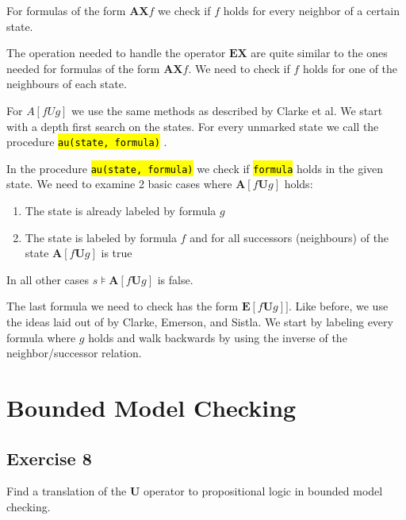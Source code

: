 \documentclass[a4paper, 12pt]{article}
\newcommand{\codeinput}[1]
{
    \begin{leftbar}
        {\fontsize{9pt}{11pt}}
    \end{leftbar}
}
\newcommand{\code}[1]
{
    \hl{\texttt{#1}}
}
\begin{document}
For formulas of the form $\mathbf{AX} f$ we check if $f$ holds for every
neighbor of a certain state.

\codeinput{label_AX}

The operation needed to handle the operator $\mathbf{EX}$ are quite similar to
the ones needed for formulas of the form $\mathbf{AX} f$. We need to check if
$f$ holds for one of the neighbours of each state.

\codeinput{label_EX}

For $A[f U g]$ we use the same methods as described by Clarke et al. We start
with a depth first search on the states. For every unmarked state we call the
procedure \code{au(state, formula)}.

\codeinput{label_AU}

In the procedure \code{au(state, formula)} we check if \code{formula} holds in
the given state. We need to examine 2 basic cases where $\textbf{A}[f
\textbf{U} g]$ holds:

\begin{enumerate}

    \item The state is already labeled by formula $g$

    \item The state is labeled by formula $f$ and for all successors
    (neighbours) of the state $\textbf{A}[f \textbf{U}g]$ is true

\end{enumerate}

In all other cases $s⊧\mathbf{A}[f \mathbf{U} g]$ is false.

\codeinput{au}

The last formula we need to check has the form $\mathbf{E}[f \mathbf{U} g]]$.
Like before, we use the ideas laid out of by Clarke, Emerson, and Sistla. We
start by labeling every formula where $g$ holds and walk backwards by using
the inverse of the neighbor/successor relation.

\codeinput{label_EU}

\section{Bounded Model Checking}

\subsection{Exercise 8}

Find a translation of the $\mathbf{U}$ operator to propositional logic in
bounded model checking.
\end{document}
